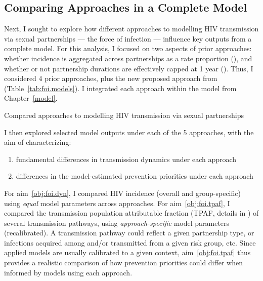\subsection{Comparing Approaches in a Complete Model}\label{foi.exp.model}
Next, I sought to explore how different approaches to
modelling HIV transmission via sexual partnerships --- \ie the force of infection ---
influence key outputs from a complete model.
For this analysis, I focused on two aspects of prior approaches:
whether incidence is aggregated across partnerships as a rate \vs proportion (),
and whether or not partnership durations are effectively capped at 1 year ().
Thus, I considered 4 prior approaches, plus the new proposed approach from 
(Table~\ref{tab:foi.models}).
I integrated each approach within the model from Chapter~\ref{model}.
\begin{table}[h]
  \centering
  \caption{Compared approaches to modelling HIV transmission via sexual partnerships}
  \label{tab:foi.models}
  
\end{table}
\par
I then explored selected model outputs under each of the 5 approaches,
with the aim of characterizing:
\begin{enumerate}
  \item \label{obj:foi.dyn}
  fundamental differences in transmission dynamics under each approach
  \item \label{obj:foi.tpaf}
  differences in the model-estimated prevention priorities under each approach
\end{enumerate}
For aim~\ref{obj:foi.dyn}, I compared HIV incidence (overall and group-specific)
using \emph{equal} model parameters across approaches.
For aim~\ref{obj:foi.tpaf}, I compared
the transmission population attributable fraction (TPAF, details in )
of several transmission pathways,
using \emph{approach-specific} model parameters (recalibrated).
A transmission pathway could reflect a given partnership type,
or infections acquired among and/or transmitted from a given risk group, etc.
Since applied models are usually calibrated to a given context,
aim~\ref{obj:foi.tpaf} thus provides a realistic comparison of
how prevention priorities could differ when informed by models using each approach.

